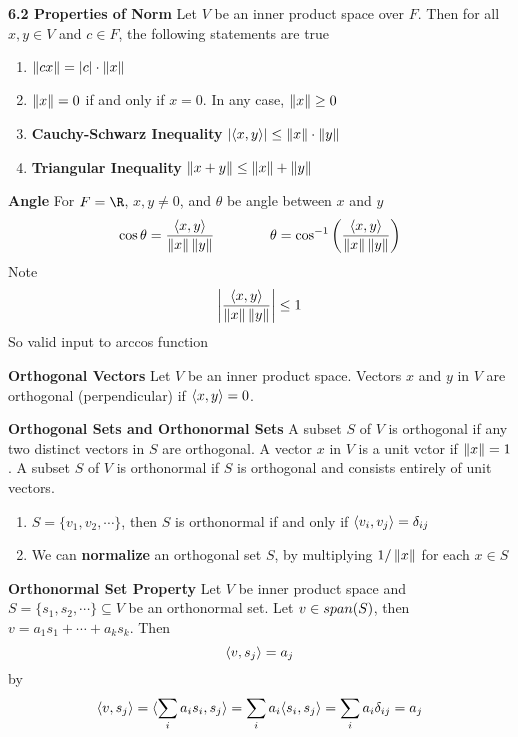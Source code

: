 \documentclass[11pt]{article}
\begin{document}
\begin{defn*}
    \textbf{6.2 Properties of Norm} Let $V$ be an inner product space over $F$. Then for all $x,y\in V$ and $c\in F$, the following statements are true 
    \begin{enumerate}
        \item $\left\lVert cx\right\rVert = |c| \cdot \left\lVert x\right\rVert$ 
        \item $\left\lVert x\right\rVert = 0$ if and only if $x=0$. In any case, $\left\lVert x\right\rVert \geq 0$ 
        \item \textbf{Cauchy-Schwarz Inequality} $|\langle x,y\rangle| \leq \left\lVert x\right\rVert \cdot \left\lVert y\right\rVert$
        \item \textbf{Triangular Inequality} $\left\lVert x+y\right\rVert \leq \left\lVert x\right\rVert + \left\lVert y\right\rVert$
    \end{enumerate}
\end{defn*}

\begin{defn*}
    \textbf{Angle} For $F=\R$, $x,y \neq 0$, and $\theta$ be angle between $x$ and $y$
    \[
        \cos{\theta} = \frac{\langle x,y\rangle}{\left\lVert x\right\rVert\left\lVert y\right\rVert}
        \quad \quad \quad \quad 
        \theta = \cos^{-1}\left( \frac{\langle x,y\rangle}{\left\lVert x\right\rVert\left\lVert y\right\rVert} \right)
    \]
    Note
    \[
        \left|\frac{\langle x,y\rangle}{\left\lVert x\right\rVert\left\lVert y\right\rVert}\right| \leq 1
    \]
    So valid input to arccos function
\end{defn*}

\begin{defn*}
    \textbf{Orthogonal Vectors} Let $V$ be an inner product space. Vectors $x$ and $y$ in $V$ are orthogonal (perpendicular) if $\langle x,y\rangle = 0$.
\end{defn*}

\begin{defn*}
    \textbf{Orthogonal Sets and Orthonormal Sets} A subset $S$ of $V$ is orthogonal if any two distinct vectors in $S$ are orthogonal. A vector $x$ in $V$ is a unit vctor if $\left\lVert x\right\rVert = 1$. A subset $S$ of $V$ is orthonormal if $S$ is orthogonal and consists entirely of unit vectors. 
    \begin{enumerate}
        \item $S = \{v_1,v_2,\cdots\}$, then $S$ is orthonormal if and only if $\langle v_i,v_j\rangle = \delta_{ij}$
        \item We can \textbf{normalize} an orthogonal set $S$, by multiplying $1/\left\lVert x\right\rVert$ for each $x\in S$
    \end{enumerate}
\end{defn*}


\begin{defn*}
    \textbf{Orthonormal Set Property} Let $V$ be inner product space and \\ $S = \{s_1,s_2,\cdots\}\subseteq V$ be an orthonormal set. Let $v\in span(S)$, then $v = a_1s_1 + \cdots + a_k s_k$. Then 
    \[
        \langle v,s_j\rangle = a_j    
    \]
    by
    \[
        \langle v,s_j\rangle = \langle\sum_i a_i s_i,s_j\rangle = \sum_i a_i \langle s_i,s_j\rangle = \sum_i a_i \delta_{ij} = a_j    
    \]
\end{defn*}
\end{document}
